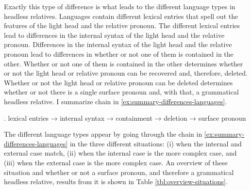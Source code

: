 Exactly this type of difference is what leads to the different language types in headless relatives. Languages contain different lexical entries that spell out the features of the light head and the relative pronoun.
The different lexical entries lead to differences in the internal syntax of the light head and the relative pronoun.
Differences in the internal syntax of the light head and the relative pronoun lead to differences in whether or not one of them is contained in the other.
Whether or not one of them is contained in the other determines whether or not the light head or relative pronoun can be recovered and, therefore, deleted.
Whether or not the light head or relative pronoun can be deleted determines whether or not there is a single surface pronoun and, with that, a grammatical headless relative.
I summarize chain in \ref{ex:summary-differences-languages}.

\ex.\label{ex:summary-differences-languages} lexical entries → internal syntax → containment → deletion → surface pronoun

The different language types appear by going through the chain in \ref{ex:summary-differences-languages} in the three different situations: (i) when the internal and external case match, (ii) when the internal case is the more complex case, and (iii) when the external case is the more complex case. An overview of these situation and whether or not a surface pronoun, and therefore a grammatical headless relative, results from it is shown in Table \ref{tbl:overview-situations}.

